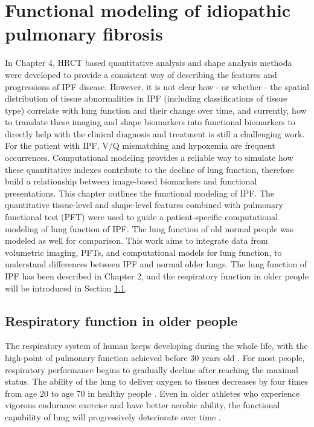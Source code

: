 \chapter{Functional modeling of idiopathic pulmonary fibrosis}\label{Yuwen_ModelBasedAnalysis}
In Chapter 4, HRCT based quantitative analysis and shape analysis methoda were developed to provide a consistent way of describing the features and progressions of IPF disease. However, it is not clear how - or whether - the spatial distribution of tissue abnormalities in IPF (including classifications of tissue type) correlate with lung function and their change over time, and currently, how to translate these imaging and shape biomarkers into functional biomarkers to directly help with the clinical diagnosis and treatment is still a challenging work. For the patient with IPF, V/Q mismatching and hypoxemia are frequent occurrences. Computational modeling provides a reliable way to simulate how these quantitative indexes contribute to the decline of lung function, therefore build a relationship between image-based biomarkers and functional presentations. This chapter outlines the functional modeling of IPF. The quantitative tissue-level and shape-level features combined with pulmonary functional test (PFT) were used to guide a patient-specific computational modeling of lung function of IPF. The lung function of old normal people was modeled as well for comparison. This work aims to integrate data from volumetric imaging, PFTs, and computational models for lung function, to understand differences between IPF and normal older lungs. The lung function of IPF has been described in Chapter 2, and the respiratory function in older people will be introduced in Section \ref{OlderRespiratory}.

\section{Respiratory function in older people} \label{OlderRespiratory}
The respiratory system of human keeps developing during the whole life, with the high-point of pulmonary function achieved before 30 years old \citep{janssens1999physiological,sprung2006age}. For most people, respiratory performance begins to gradually decline after reaching the maximal status. The ability of the lung to deliver oxygen to tissues decreases by four times from age 20 to age 70 in healthy people \citep{smith1986respiratory,zaugg2000respiratory}. Even in older athletes who experience vigorous endurance exercise and have better aerobic ability, the functional capability of lung will progressively deteriorate over time \citep{mittman1965relationship, pollock1997twenty, mcclaran1995longitudinal}. 

